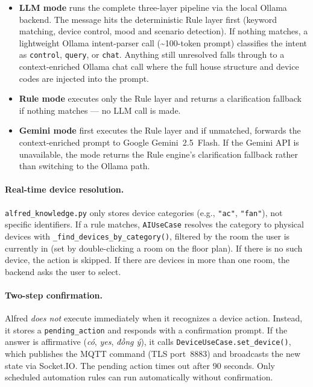 \begin{itemize}
   \item \textbf{LLM mode} runs the complete three-layer pipeline via the local Ollama backend. The message hits the deterministic Rule layer first (keyword matching, device control, mood and scenario detection). If nothing matches, a lightweight Ollama intent-parser call (\textasciitilde{}100-token prompt) classifies the intent as \texttt{control}, \texttt{query}, or \texttt{chat}. Anything still unresolved falls through to a context-enriched Ollama chat call where the full house structure and device codes are injected into the prompt.

\item \textbf{Rule mode} executes only the Rule layer and returns a clarification fallback if nothing matches --- no LLM call is made.

\item \textbf{Gemini mode} first executes the Rule layer and if unmatched, forwards the context-enriched prompt to Google Gemini~2.5~Flash. If the Gemini API is unavailable, the mode returns the Rule engine's clarification fallback rather than switching to the Ollama path.

\end{itemize}

\paragraph{Real-time device resolution.} \texttt{alfred\_knowledge.py} only stores device categories (e.g., \texttt{"ac"}, \texttt{"fan"}), not specific identifiers. If a rule matches, \texttt{AIUseCase} resolves the category to physical devices with \texttt{\_find\_devices\_by\_category()}, filtered by the room the user is currently in (set by double-clicking a room on the floor plan). If there is no such device, the action is skipped. If there are devices in more than one room, the backend asks the user to select.

\paragraph{Two-step confirmation.}
Alfred \emph{does not} execute immediately when it recognizes a device action. Instead, it stores a \texttt{pending\_action} and responds with a confirmation prompt. If the answer is affirmative (\textit{có}, \textit{yes}, \textit{đồng ý}), it calls \texttt{DeviceUseCase.set\_device()}, which publishes the MQTT command (TLS port~8883) and broadcasts the new state via Socket.IO. The pending action times out after 90 seconds. Only scheduled automation rules can run automatically without confirmation.

